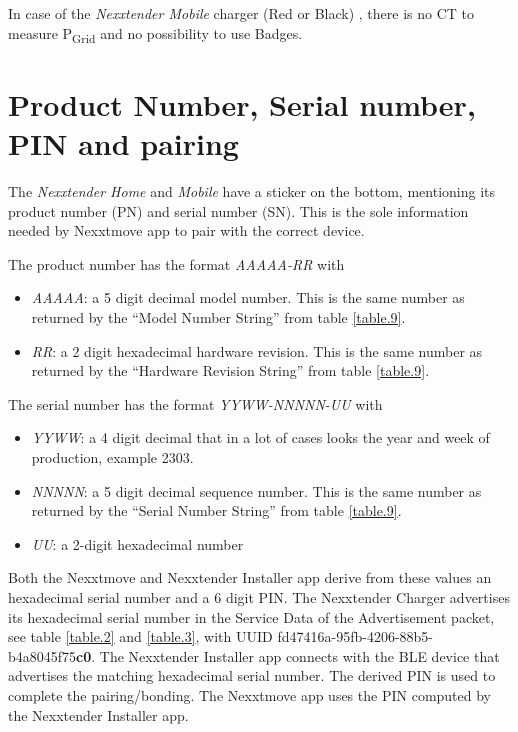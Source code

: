 \documentclass[a4paper]{article}
\begin{document}
In case of the \emph{Nexxtender Mobile} charger (Red or Black) , 
there is no CT to measure P\textsubscript{Grid} and no possibility to use Badges.

\section{Product Number, Serial number, PIN and pairing}
\label{product_number_serial_number_pin_and_pairing}

The \emph{Nexxtender Home} and \emph{Mobile} have a sticker on the bottom,
mentioning its product number (PN) and serial number (SN). 
This is the sole information needed by Nexxtmove app to pair with the correct device.

The product number has the format \emph{AAAAA-RR} with

\begin{itemize}
	
	\item
	      \emph{AAAAA}: a 5 digit decimal model number. 
	      This is the same number as returned by the ``Model Number String'' from table \ref{table.9}.
	\item
	      \emph{RR}: a 2 digit hexadecimal hardware revision. 
	      This is the same number as returned by the ``Hardware Revision String'' from table \ref{table.9}.
\end{itemize}

The serial number has the format \emph{YYWW-NNNNN-UU} with

\begin{itemize}
	
	\item
	      \emph{YYWW}: a 4 digit decimal that in a lot of cases looks the year
	      and week of production, example 2303.
	\item
	      \emph{NNNNN}: a 5 digit decimal sequence number. 
	      This is the same number as returned by the ``Serial Number String'' from table \ref{table.9}.
	\item
	      \emph{UU}: a 2-digit hexadecimal number
\end{itemize}

Both the Nexxtmove and Nexxtender Installer app derive from these values
an hexadecimal serial number and a 6 digit PIN. 
The Nexxtender Charger advertises its hexadecimal serial number in the Service Data of the Advertisement packet, 
see table \ref{table.2} and \ref{table.3}, 
with UUID fd47416a-95fb-4206-88b5-b4a8045f75\textbf{c0}. 
The Nexxtender Installer app connects with the BLE device that advertises the matching hexadecimal serial number. 
The derived PIN is used to complete the pairing/bonding. 
The Nexxtmove app uses the PIN computed by the Nexxtender Installer app.
\end{document}
